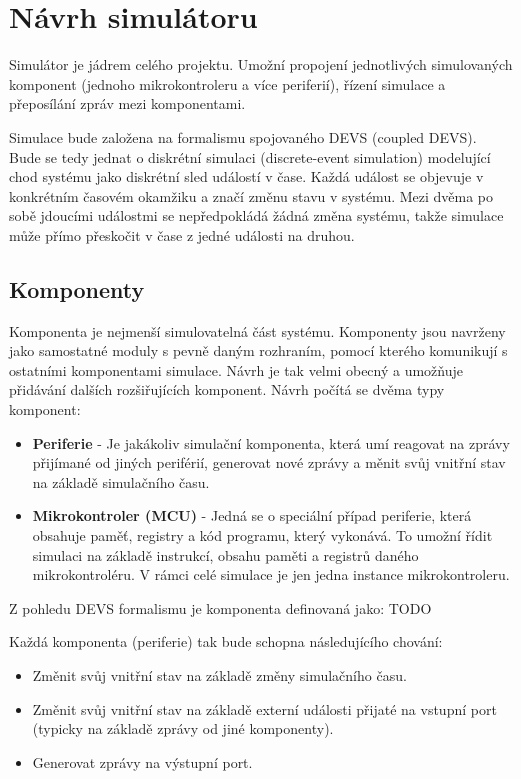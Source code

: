 \section{Návrh simulátoru}

Simulátor je jádrem celého projektu. Umožní propojení jednotlivých simulovaných komponent (jednoho mikrokontroleru a více periferií), řízení simulace
a přeposílání zpráv mezi komponentami.

Simulace bude založena na formalismu spojovaného DEVS (coupled DEVS). Bude se tedy jednat o diskrétní simulaci (discrete-event simulation) 
modelující chod systému jako diskrétní sled událostí v čase. Každá událost se objevuje v konkrétním časovém okamžiku a značí změnu stavu v systému.
Mezi dvěma po sobě jdoucími událostmi se nepředpokládá žádná změna systému, takže simulace může přímo přeskočit v čase z jedné události na druhou.

\subsection{Komponenty}

Komponenta je nejmenší simulovatelná část systému. Komponenty jsou navrženy jako samostatné moduly s pevně daným rozhraním, pomocí kterého komunikují s ostatními komponentami simulace. Návrh je tak velmi obecný a umožňuje přidávání dalších rozšiřujících komponent.
Návrh počítá se dvěma typy komponent:

\begin{itemize}
\item \textbf{Periferie} - Je jakákoliv simulační komponenta, která umí reagovat na zprávy přijímané od jiných periférií, generovat nové zprávy a měnit svůj vnitřní stav na základě simulačního času.
\item \textbf{Mikrokontroler (MCU)} - Jedná se o speciální případ periferie, která obsahuje paměť, registry a kód programu, který vykonává.
To umožní řídit simulaci na základě instrukcí, obsahu paměti a registrů daného mikrokontroléru.  V rámci celé simulace je jen jedna instance mikrokontroleru. 
\end{itemize}

Z pohledu DEVS formalismu je komponenta definovaná jako: TODO

Každá komponenta (periferie) tak bude schopna následujícího chování:

\begin{itemize}
\item Změnit svůj vnitřní stav na základě změny simulačního času.
\item Změnit svůj vnitřní stav na základě externí události přijaté na vstupní port (typicky na základě zprávy od jiné komponenty).
\item Generovat zprávy na výstupní port.
\end{itemize}

